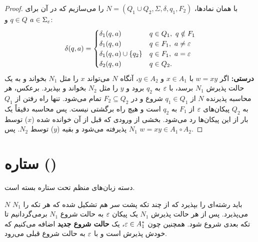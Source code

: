 \begin{proof}
با همان نمادها، $N=(Q_1\cup Q_2,\Sigma,\delta,q_1,F_2)$ را می‌سازیم که در آن برای $q\in Q$ و $a\in\Sigma_\varepsilon$:
\[\delta(q,a)=\begin{cases}
\delta_1(q,a) & q\in Q_1,\ q\notin F_1\\
\delta_1(q,a) & q\in F_1,\ a\neq\varepsilon\\
\delta_1(q,a)\cup\{q_2\} & q\in F_1,\ a=\varepsilon\\
\delta_2(q,a) & q\in Q_2.
\end{cases}\]
\textbf{درستی:} اگر $w=xy$ با $x\in A_1$ و $y\in A_2$، آنگاه $N$ می‌تواند $x$ را مثل $N_1$ بخواند و به یک حالت پذیرش $N_1$ برسد، با $\varepsilon$ به $q_2$ برود و $y$ را مثل $N_2$ بخواند و بپذیرد. برعکس، هر محاسبه پذیرنده $N$ از $q_1\in Q_1$ شروع و در $F_2\subseteq Q_2$ تمام می‌شود. تنها راه رفتن از $Q_1$ به $Q_2$ پیکان‌های $\varepsilon$ از $F_1$ به $q_2$ است و هیچ راه برگشتی نیست. پس محاسبه دقیقاً یک بار از این پیکان‌ها رد می‌شود. بخشی از ورودی که قبل از آن خوانده شده ($x$) توسط $N_1$ پذیرفته می‌شود و بقیه ($y$) توسط $N_2$. پس $w=xy\in A_1\circ A_2$.
\end{proof}

\section{ستاره ()}

\begin{theorem}
دسته زبان‌های منظم تحت ستاره بسته است.
\end{theorem}

\begin{proofidea}
$N$ باید رشته‌ای را بپذیرد که از چند تکه پشت سر هم تشکیل شده که هر تکه را $N_1$ می‌پذیرد. پس از هر حالت پذیرش $N_1$ یک پیکان $\varepsilon$ به حالت شروع $N_1$ برمی‌گردانیم تا تکه بعدی شروع شود. همچنین چون $\varepsilon\in A_1^*$، یک \textbf{حالت شروع جدید} اضافه می‌کنیم که خودش پذیرش است و با $\varepsilon$ به حالت شروع قبلی می‌رود.
\begin{ltrfig}
\end{ltrfig}
\end{proofidea}

